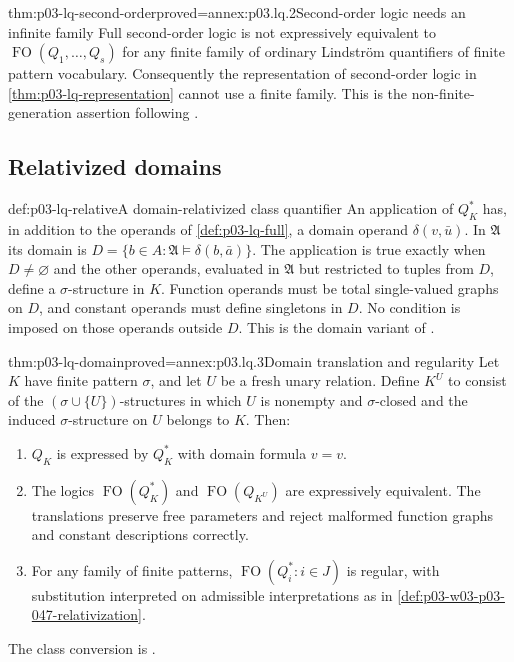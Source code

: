\begin{hbtheorem}{thm:p03-lq-second-order}{proved=annex:p03.lq.2}{Second-order logic needs an infinite family}
Full second-order logic is not expressively equivalent to
\(\operatorname{FO}(Q_1,\ldots,Q_s)\) for any finite family of
ordinary Lindstr\"om quantifiers of finite pattern vocabulary.
Consequently the representation of second-order logic in
\cref{thm:p03-lq-representation} cannot use a finite family.
This is the non-finite-generation assertion following
\cite[Ch.~II, Theorem~4.1.3, p.~51]{Ebbinghaus1985ExtendedLogics}.
\end{hbtheorem}

\subsection{Relativized domains}

\begin{hbdefinition}{def:p03-lq-relative}{A domain-relativized class quantifier}
An application of \(Q_K^*\) has, in addition to the operands of
\cref{def:p03-lq-full}, a domain operand \(\delta(v,\bar u)\).
In \(\mathfrak A\) its domain is
\(D=\{b\in A:\mathfrak A\models\delta(b,\bar a)\}\).
The application is true exactly when \(D\ne\varnothing\) and the
other operands, evaluated in \(\mathfrak A\) but restricted to tuples
from \(D\), define a \(\sigma\)-structure in \(K\).
Function operands must be total single-valued graphs on \(D\), and
constant operands must define singletons in \(D\).
No condition is imposed on those operands outside \(D\).
This is the domain variant of
\cite[Ch.~II, Definition~4.1.4, p.~51]{Ebbinghaus1985ExtendedLogics}.
\end{hbdefinition}

\begin{hbtheorem}{thm:p03-lq-domain}{proved=annex:p03.lq.3}{Domain translation and regularity}
Let \(K\) have finite pattern \(\sigma\), and let \(U\) be a fresh
unary relation. Define \(K^U\) to consist of the
\((\sigma\cup\{U\})\)-structures in which \(U\) is nonempty and
\(\sigma\)-closed and the induced \(\sigma\)-structure on \(U\)
belongs to \(K\). Then:
\begin{enumerate}
 \item \(Q_K\) is expressed by \(Q_K^*\) with domain formula \(v=v\).
 \item The logics \(\operatorname{FO}(Q_K^*)\) and
       \(\operatorname{FO}(Q_{K^U})\) are expressively equivalent.
       The translations preserve free parameters and reject malformed
       function graphs and constant descriptions correctly.
 \item For any family of finite patterns,
       \(\operatorname{FO}(Q_i^*:i\in J)\) is regular, with
       substitution interpreted on admissible interpretations as in
       \cref{def:p03-w03-p03-047-relativization}.
\end{enumerate}
The class conversion is
\cite[Ch.~II, Proposition~4.1.5, p.~52]{Ebbinghaus1985ExtendedLogics}.
\end{hbtheorem}

